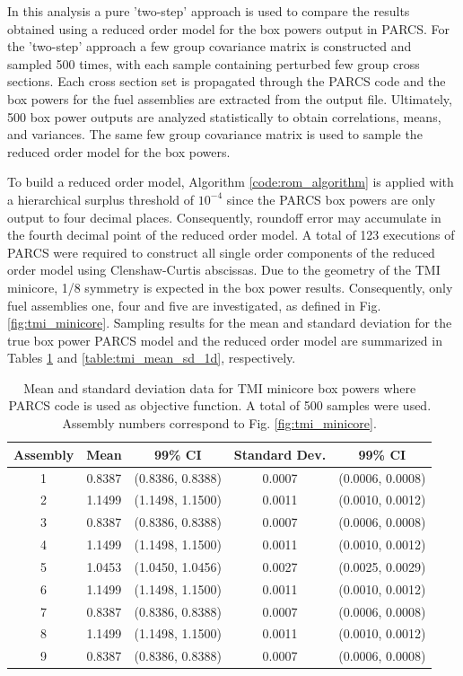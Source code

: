 In this analysis a pure 'two-step' approach is used to compare the results obtained using a reduced order model for the box powers output in \ac{PARCS}. For the 'two-step' approach a few group covariance matrix is constructed and sampled 500 times, with each sample containing perturbed few group cross sections. Each cross section set is propagated through the \ac{PARCS} code and the box powers for the fuel assemblies are extracted from the output file. Ultimately, 500 box power outputs are analyzed statistically to obtain correlations, means, and variances. The same few group covariance matrix is used to sample the reduced order model for the box powers.    

To build a reduced order model, Algorithm \ref{code:rom_algorithm} is applied with a hierarchical surplus threshold of $10^{-4}$ since the \ac{PARCS} box powers are only output to four decimal places. Consequently, roundoff error may accumulate in the fourth decimal point of the reduced order model. A total of 123 executions of \ac{PARCS} were required to construct all single order components of the reduced order model using Clenshaw-Curtis abscissas. Due to the geometry of the \ac{TMI} minicore, 1/8 symmetry is expected in the box power results. Consequently, only fuel assemblies one, four and five are investigated, as defined in Fig. \ref{fig:tmi_minicore}. Sampling results for the mean and standard deviation for the true box power \ac{PARCS} model and the reduced order model are summarized in Tables \ref{table:tmi_mean_sd_mc} and \ref{table:tmi_mean_sd_1d}, respectively. 
%
\begin{table}[!htb] 
\caption{\label{table:tmi_mean_sd_mc} 
Mean and standard deviation data for \ac{TMI} minicore box powers where \ac{PARCS} code is used as objective function. A total of 500 samples were used. Assembly numbers correspond to Fig. \ref{fig:tmi_minicore}.}
\centering
\begin{tabular}{||c|c|c|c|c||} 
\hline \hline
\textbf{Assembly} & \textbf{Mean} & \textbf{99\% CI} & \textbf{Standard Dev.} & \textbf{99\% CI} \\ \hline
1 & 0.8387 & (0.8386, 0.8388) & 0.0007 & (0.0006, 0.0008) \\ \hline 
2 & 1.1499 & (1.1498, 1.1500) & 0.0011 & (0.0010, 0.0012) \\ \hline
3 & 0.8387 & (0.8386, 0.8388) & 0.0007 & (0.0006, 0.0008) \\ \hline
4 & 1.1499 & (1.1498, 1.1500) & 0.0011 & (0.0010, 0.0012) \\ \hline
5 & 1.0453 & (1.0450, 1.0456) & 0.0027 & (0.0025, 0.0029) \\ \hline
6 & 1.1499 & (1.1498, 1.1500) & 0.0011 & (0.0010, 0.0012) \\ \hline
7 & 0.8387 & (0.8386, 0.8388) & 0.0007 & (0.0006, 0.0008) \\ \hline
8 & 1.1499 & (1.1498, 1.1500) & 0.0011 & (0.0010, 0.0012) \\ \hline
9 & 0.8387 & (0.8386, 0.8388) & 0.0007 & (0.0006, 0.0008) \\ 
\hline \hline
\end{tabular}
\end{table}
